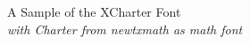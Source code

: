 \documentclass[11pt]{article}
\begin{document}
{\LARGE \noindent A Sample of the XCharter Font}\\

{\large \noindent \textit{with Charter from newtxmath as math font}}\\[5pt]


\end{document}
